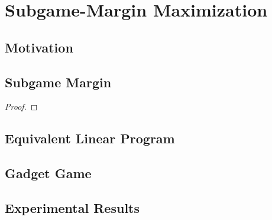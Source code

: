 \chapter{Subgame-Margin Maximization}
\label{ch:max-margin}

\section{Motivation}

\section{Subgame Margin}

\begin{defn}
\end{defn}

\begin{thm}
  \todo
\end{thm}

\begin{proof}
  \todo
\end{proof}

\section{Equivalent Linear Program}

\section{Gadget Game}

\section{Experimental Results}
